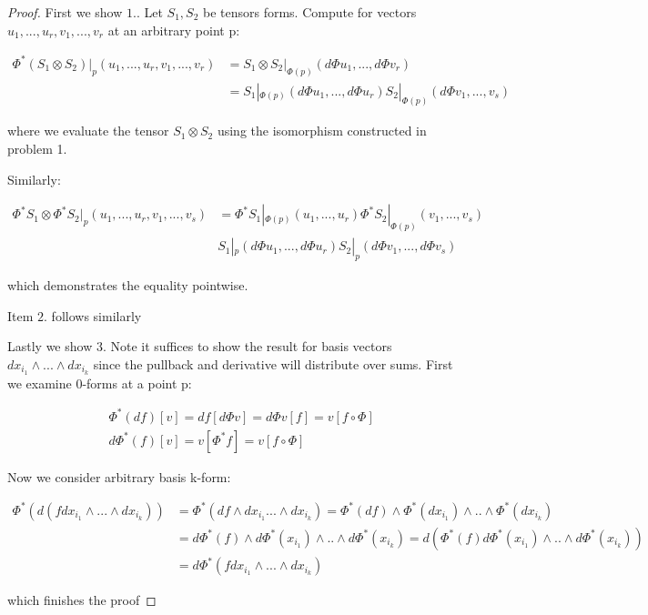 \documentclass[11pt]{article}
\begin{document}
\begin{proof}

	First we show $1.$. Let $S_1,S_2$ be tensors forms. Compute for vectors $u_1,...,u_r,v_1,...,v_r$ at an arbitrary point p:

	\begin{align*}
		\Phi^*(S_1 \otimes S_2)|_p(u_1,...,u_r,v_1,...,v_r) &= S_1\otimes S_2|_{\Phi(p)}(d \Phi u_1,...,d\Phi v_r)  \\
		&= S_1|_{\Phi(p)}(d \Phi u_1,...,d \Phi u_r) S_2|_{\Phi(p)}(d \Phi v_1,...,v_s)
	\end{align*}

	where we evaluate the tensor $S_1\otimes S_2$ using the isomorphism constructed in problem 1. %

	Similarly:

	\begin{align*}
		\Phi^* S_1 \otimes \Phi^*  S_2|_p(u_1,...,u_r,v_1,...,v_s) &= \Phi^* S_1|_{\Phi(p)} (u_1,...,u_r) \Phi^*S_2|_{\Phi(p)} (v_1,...,v_s) \\
		& S_1|_p(d \Phi u_1,...,d \Phi u_r) S_2|_p(d \Phi v_1,...,d \Phi v_s)
	\end{align*}

	which demonstrates the equality pointwise.

	Item $2.$ follows similarly%

	Lastly we show $3.$ Note it suffices to show the result for basis vectors $dx_{i_1} \wedge ... \wedge dx_{i_k}$ since the pullback and derivative will distribute over sums. First we examine 0-forms at a point p:

	\begin{align*}
		&\Phi^*(d f)[v] = df [d \Phi v] = d \Phi v [f] = v[f \circ \Phi]\\
		&d \Phi^*(f)[v] = v [\Phi^* f] = v[f \circ \Phi]
	\end{align*}

	Now we consider arbitrary basis k-form:

	\begin{align*}
		\Phi^*(d (f dx_{i_1} \wedge ... \wedge dx_{i_k})) &= \Phi^*(df \wedge dx_{i_1} ... \wedge dx_{i_k}) = \Phi^*(df) \wedge \Phi^*(dx_{i_1}) \wedge .. \wedge \Phi^*(dx_{i_k})\\
		 &= d\Phi^*(f) \wedge d\Phi^*(x_{i_1}) \wedge .. \wedge d\Phi^*(x_{i_k}) = d (\Phi^*(f)  d\Phi^*(x_{i_1}) \wedge .. \wedge d\Phi^*(x_{i_k}))\\
		 & = d \Phi^*(f dx_{i_1} \wedge ... \wedge dx_{i_k})
	\end{align*}

	which finishes the proof

\end{proof}
\end{document}
